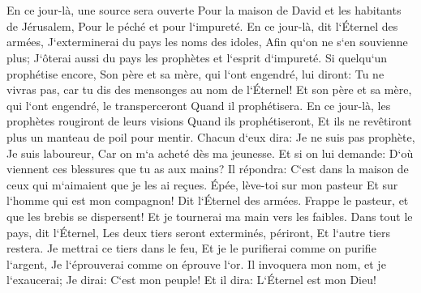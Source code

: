 \chapter{}

\verse En ce jour-là, une source sera ouverte Pour la maison de David et les habitants de Jérusalem, Pour le péché et pour l`impureté. 
\verse En ce jour-là, dit l`Éternel des armées, J`exterminerai du pays les noms des idoles, Afin qu`on ne s`en souvienne plus; J`ôterai aussi du pays les prophètes et l`esprit d`impureté. 
\verse Si quelqu`un prophétise encore, Son père et sa mère, qui l`ont engendré, lui diront: Tu ne vivras pas, car tu dis des mensonges au nom de l`Éternel! Et son père et sa mère, qui l`ont engendré, le transperceront Quand il prophétisera. 
\verse En ce jour-là, les prophètes rougiront de leurs visions Quand ils prophétiseront, Et ils ne revêtiront plus un manteau de poil pour mentir. 
\verse Chacun d`eux dira: Je ne suis pas prophète, Je suis laboureur, Car on m`a acheté dès ma jeunesse. 
\verse Et si on lui demande: D`où viennent ces blessures que tu as aux mains? Il répondra: C`est dans la maison de ceux qui m`aimaient que je les ai reçues. 
\verse Épée, lève-toi sur mon pasteur Et sur l`homme qui est mon compagnon! Dit l`Éternel des armées. Frappe le pasteur, et que les brebis se dispersent! Et je tournerai ma main vers les faibles. 
\verse Dans tout le pays, dit l`Éternel, Les deux tiers seront exterminés, périront, Et l`autre tiers restera. 
\verse Je mettrai ce tiers dans le feu, Et je le purifierai comme on purifie l`argent, Je l`éprouverai comme on éprouve l`or. Il invoquera mon nom, et je l`exaucerai; Je dirai: C`est mon peuple! Et il dira: L`Éternel est mon Dieu! 

\chapter{}

